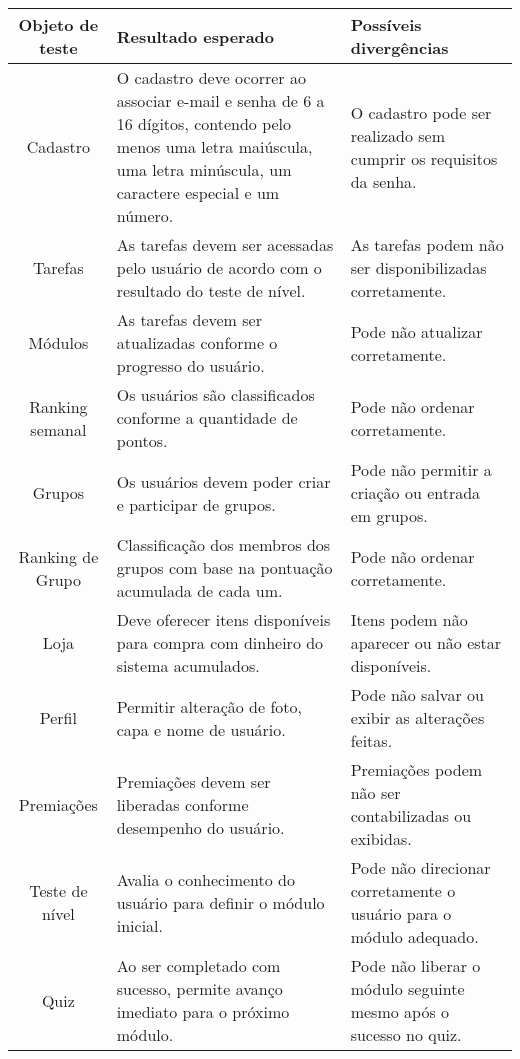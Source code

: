 \documentclass[
	article,			%
	12pt,				%
	oneside,			%
	a4paper,			%
	english,			%
	brazil,				%
	sumario=tradicional
	]{abntex2}
\begin{document}
\begin{center}
\begin{tabular}{|c|p{5.5cm}|p{6.5cm}|}
\hline
\textbf{Objeto de teste} & \textbf{Resultado esperado} & \textbf{Possíveis divergências} \\
\hline
Cadastro & O cadastro deve ocorrer ao associar e-mail e senha de 6 a 16 dígitos, contendo pelo menos uma letra maiúscula, uma letra minúscula, um caractere especial e um número. & O cadastro pode ser realizado sem cumprir os requisitos da senha. \\
\hline
Tarefas & As tarefas devem ser acessadas pelo usuário de acordo com o resultado do teste de nível. & As tarefas podem não ser disponibilizadas corretamente. \\
\hline
Módulos & As tarefas devem ser atualizadas conforme o progresso do usuário. & Pode não atualizar corretamente. \\
\hline
Ranking semanal & Os usuários são classificados conforme a quantidade de pontos. & Pode não ordenar corretamente. \\
\hline
Grupos & Os usuários devem poder criar e participar de grupos. & Pode não permitir a criação ou entrada em grupos. \\
\hline
Ranking de Grupo & Classificação dos membros dos grupos com base na pontuação acumulada de cada um. & Pode não ordenar corretamente. \\
\hline
Loja & Deve oferecer itens disponíveis para compra com dinheiro do sistema acumulados. & Itens podem não aparecer ou não estar disponíveis. \\
\hline
Perfil & Permitir alteração de foto, capa e nome de usuário. & Pode não salvar ou exibir as alterações feitas. \\
\hline
Premiações & Premiações devem ser liberadas conforme desempenho do usuário. & Premiações podem não ser contabilizadas ou exibidas. \\
\hline
Teste de nível & Avalia o conhecimento do usuário para definir o módulo inicial. & Pode não direcionar corretamente o usuário para o módulo adequado. \\
\hline
Quiz & Ao ser completado com sucesso, permite avanço imediato para o próximo módulo. & Pode não liberar o módulo seguinte mesmo após o sucesso no quiz. \\
\hline
\end{tabular}
\end{center}


\vspace{1cm} 
\end{document}
